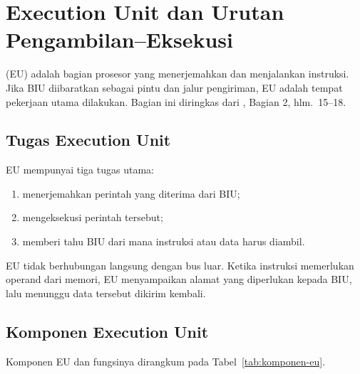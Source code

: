 \section{Execution Unit dan Urutan Pengambilan--Eksekusi}
\label{sec:eu}

 (EU) adalah bagian prosesor yang menerjemahkan
dan menjalankan instruksi. Jika BIU diibaratkan sebagai pintu dan
jalur pengiriman, EU adalah tempat pekerjaan utama dilakukan. Bagian
ini diringkas dari \cite{gunawan2019}, Bagian 2, hlm.~15--18.

\subsection{Tugas Execution Unit}

EU mempunyai tiga tugas utama:

\begin{enumerate}
    \item menerjemahkan perintah yang diterima dari BIU;
    \item mengeksekusi perintah tersebut;
    \item memberi tahu BIU dari mana instruksi atau data harus
          diambil.
\end{enumerate}

EU tidak berhubungan langsung dengan bus luar. Ketika instruksi
memerlukan operand dari memori, EU menyampaikan alamat yang
diperlukan kepada BIU, lalu menunggu data tersebut dikirim kembali.

\subsection{Komponen Execution Unit}

Komponen EU dan fungsinya dirangkum pada Tabel~\ref{tab:komponen-eu}.


